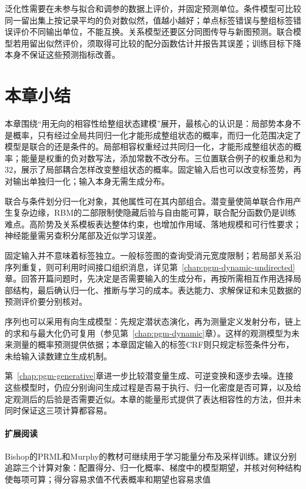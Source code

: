 泛化性需要在未参与拟合和调参的数据上评价，并固定预测单位。条件模型可比较同一留出集上按记录平均的负对数似然，值越小越好；单点标签错误与整组标签错误评价不同输出单位，不能互换。关系模型还要区分同图传导与新图预测。联合模型若用留出似然评价，须取得可比较的配分函数估计并报告其误差；训练目标下降本身不保证这些预测指标改善。

\section{本章小结}
\label{sec:pgm-energy-models-summary}

本章围绕“用无向的相容性给整组状态建模”展开，最核心的认识是：局部势本身不是概率，只有经过全局共同归一化才能形成整组状态的概率，而归一化范围决定了模型是联合的还是条件的。局部相容权重经过共同归一化，才能形成整组状态的概率；能量是权重的负对数写法，添加常数不改分布。三位置联合例子的权重总和为$32$，展示了局部耦合怎样改变整组状态的概率。固定输入后也可以改变标签势，再对输出单独归一化；输入本身无需生成分布。

联合与条件划分归一化对象，其他属性可在其内部组合。潜变量使简单联合作用产生复杂边缘，RBM的二部限制使隐藏后验与自由能可算，联合配分函数仍是训练难点。高阶势及关系模板表达整体约束，也增加作用域、落地规模和可行性要求；神经能量需另查积分尾部及近似学习误差。

固定输入并不意味着标签独立。一般标签图的查询受消元宽度限制；若局部关系沿序列重复，则可利用时间接口组织消息，详见第~\ref{chap:pgm-dynamic-undirected}章。回答开篇问题时，先决定是否需要输入的生成分布，再按所需相互作用选择局部结构，最后确认归一化、推断与学习的成本。表达能力、求解保证和未见数据的预测评价要分别核对。

序列也可以采用有向生成模型：先规定潜状态演化，再为测量定义发射分布，链上的求和与最大化仍可复用（参见第~\ref{chap:pgm-dynamic}章）。这样的观测模型为未来测量的概率预测提供依据；本章固定输入的标签CRF则只规定标签条件分布，未给输入读数建立生成机制。

第~\ref{chap:pgm-generative}章进一步比较潜变量生成、可逆变换和逐步去噪。连接这些模型时，仍应分别询问生成过程是否易于执行、归一化密度是否可算，以及给定观测后的后验是否需要近似。本章的能量形式提供了表达相容性的方法，但并未同时保证这三项计算都容易。

\paragraph{扩展阅读}
Bishop的PRML和Murphy的教材可继续用于学习能量分布及采样训练。建议分别追踪三个计算对象：配置得分、归一化概率、梯度中的模型期望，并核对何种结构使每项可算；得分容易求值不代表概率和期望也容易求值
